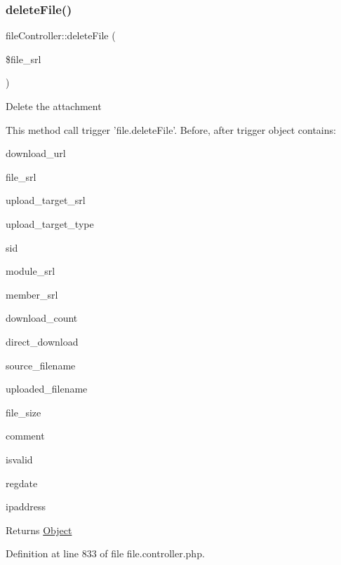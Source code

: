 \subsubsection{\texorpdfstring{delete\+File()}{deleteFile()}}
{\footnotesize\ttfamily file\+Controller\+::delete\+File (\begin{DoxyParamCaption}\item[{}]{\$file\+\_\+srl }\end{DoxyParamCaption})}

Delete the attachment


\begin{DoxyPre}
This method call trigger 'file.deleteFile'.
Before, after trigger object contains:
\begin{DoxyItemize}
\item download\_url
\item file\_srl
\item upload\_target\_srl
\item upload\_target\_type
\item sid
\item module\_srl
\item member\_srl
\item download\_count
\item direct\_download
\item source\_filename
\item uploaded\_filename
\item file\_size
\item comment
\item isvalid
\item regdate
\item ipaddress

\end{DoxyItemize}\end{DoxyPre}



\begin{DoxyPre}
\begin{DoxyReturn}{Returns}
\hyperlink{classObject}{Object}

\end{DoxyReturn}
\end{DoxyPre}


Definition at line 833 of file file.\+controller.\+php.


